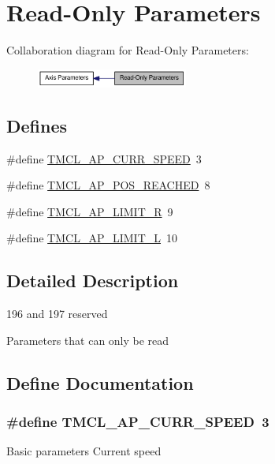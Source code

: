 \hypertarget{group__ROParam}{
\section{Read-\/Only Parameters}
\label{group__ROParam}
}


Collaboration diagram for Read-\/Only Parameters:\nopagebreak
\begin{figure}[H]
\begin{center}
\leavevmode
\includegraphics[width=141pt]{group__ROParam}
\end{center}
\end{figure}
\subsection*{Defines}
\begin{DoxyCompactItemize}
\item 
\#define \hyperlink{group__ROParam_ga3473b35e8f38849da91e101a751b474d}{TMCL\_\-AP\_\-CURR\_\-SPEED}~3
\item 
\#define \hyperlink{group__ROParam_ga8340c6753a1858eae01d9a7a0f1ea221}{TMCL\_\-AP\_\-POS\_\-REACHED}~8
\item 
\#define \hyperlink{group__ROParam_ga389a6e3b6ba6e1bc1ad719f055bf139f}{TMCL\_\-AP\_\-LIMIT\_\-R}~9
\item 
\#define \hyperlink{group__ROParam_ga4751b3398d03d02e756d6b564a735b51}{TMCL\_\-AP\_\-LIMIT\_\-L}~10
\end{DoxyCompactItemize}


\subsection{Detailed Description}
196 and 197 reserved

Parameters that can only be read 

\subsection{Define Documentation}
\hypertarget{group__ROParam_ga3473b35e8f38849da91e101a751b474d}{
\subsubsection[{TMCL\_\-AP\_\-CURR\_\-SPEED}]{\setlength{\rightskip}{0pt plus 5cm}\#define TMCL\_\-AP\_\-CURR\_\-SPEED~3}}
\label{group__ROParam_ga3473b35e8f38849da91e101a751b474d}
Basic parameters Current speed 


